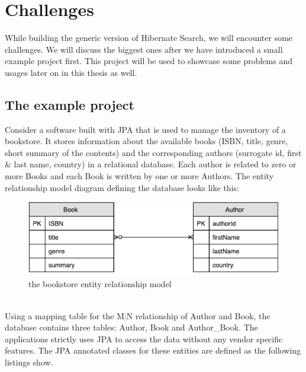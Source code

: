 
\pagebreak

\section{Challenges}\label{Challenges}
While building the generic version of Hibernate Search, we will encounter some challenges. We will discuss the biggest ones after we have introduced a small example project first. This project will be used to showcase some problems and usages later on in this thesis as well.

\subsection{The example project} \label{example_project}
Consider a software built with JPA that is used to manage the inventory of a bookstore. It stores information about the available books (ISBN, title, genre, short summary of the contents) and the corresponding authors (surrogate id, first \& last name, country) in a relational database. Each author is related to zero or more Books and each Book is written by one or more Authors. The entity relationship model diagram defining the database looks like this:
\\
\begin{figure}[ht]
	\centering
	\includegraphics[scale = 0.9]{images/Sample_Project_ER.pdf}
	\caption{the bookstore entity relationship model}
	\label{fig3}
\end{figure}
\\
Using a mapping table for the M:N relationship of Author and Book, the database contains three tables: Author, Book and Author\_Book. The applications strictly uses JPA to access the data without any vendor specific features. The JPA annotated classes for these entities are defined as the following listings show.

\pagebreak

